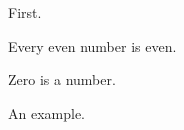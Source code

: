 \documentclass{article}
\begin{document}
\begin{theorem}First.\end{theorem}
\begin{conjecture}Every even number is even.\end{conjecture}
\begin{axiom}Zero is a number.\end{axiom}
\begin{example}An example.\end{example}
\end{document}
